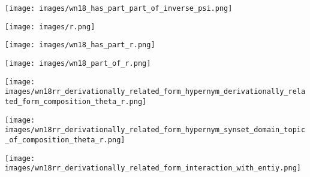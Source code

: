 \documentclass[11pt]{article}
\begin{document}
\begin{figure*}[!ht]
\centering

\begin{minipage}{3.2cm}
\centering
\texttt{[image: images/wn18\_has\_part\_part\_of\_inverse\_psi.png]}
\end{minipage}
\begin{minipage}{3.2cm}
\centering
\texttt{[image: images/r.png]}
\end{minipage}
\begin{minipage}{3.2cm}
\centering
\texttt{[image: images/wn18\_has\_part\_r.png]}
\end{minipage}\begin{minipage}{3.2cm}
\centering
\texttt{[image: images/wn18\_part\_of\_r.png]}
\end{minipage}

\begin{minipage}{4cm}
\centering
\texttt{[image: images/wn18rr\_derivationally\_related\_form\_hypernym\_derivationally\_related\_form\_composition\_theta\_r.png]}
\end{minipage}\hspace{0.5cm}
\begin{minipage}{4cm}
\centering
\texttt{[image: images/wn18rr\_derivationally\_related\_form\_hypernym\_synset\_domain\_topic\_of\_composition\_theta\_r.png]}
\end{minipage}
\hspace{0.5cm}
\begin{minipage}{4cm}
\centering
\texttt{[image: images/wn18rr\_derivationally\_related\_form\_interaction\_with\_entiy.png]}
\end{minipage}


\end{figure*}
\end{document}
